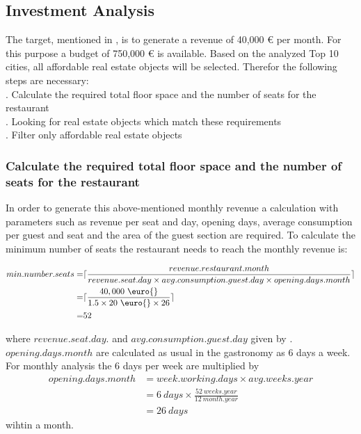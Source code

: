 \subsection{Investment Analysis}
\label{subsec:moneten}
The target, mentioned in , is to generate a revenue of 40,000 \euro{} per month. For this purpose
 a budget of 750,000 \euro{} is available. Based on the analyzed Top 10 cities, all affordable real estate objects will be
 selected. Therefor the following steps are necessary: \\
. Calculate the required total floor space and the number of seats for the restaurant \\
. Looking for real estate objects which match these requirements \\
. Filter only affordable real estate objects \\

\subsubsection{Calculate the required total floor space and the number of seats for the restaurant}
In order to generate this above-mentioned monthly revenue a calculation with parameters such as revenue per seat and day,
 opening days, average consumption per guest and seat and the area of the guest section are required. To calculate the
 minimum number of seats the restaurant needs to reach the monthly revenue is:
\begin{center}
\begin{equation}
\begin{aligned}
	min.number.seats =&\lceil\frac{revenue.restaurant.month}{revenue.seat.day \times avg.consumption.guest.day \times opening.days.month}\rceil \\
	=&\lceil\frac{40,000 \ \text{\euro{}} }{1.5 \times 20 \ \text{\euro{}} \times 26}\rceil \\
	=&52
\end{aligned}
\label{eq:number_seats_benchmark}
\end{equation}
\end{center}

where $revenue.seat.day.$ and $avg.consumption.guest.day$ given by \cite{BenchmarkGastronomie}. $opening.days.month$
 are calculated as usual in the gastronomy as 6 days a week. For monthly analysis the 6 days per week are multiplied by
\begin{equation}
    \begin{aligned}
        opening.days.month & = week.working.days \times avg.weeks.year \\
        & = 6 \ days \times \frac{52 \ weeks.year}{12 \ month.year} \\
        & = 26 \ days
    \end{aligned}
    \label{eq:opening_days}
\end{equation}
wihtin a month.


